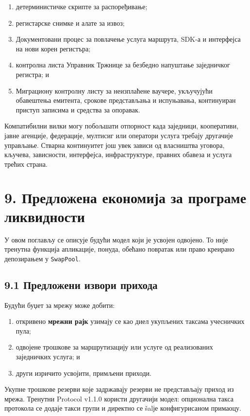 \documentclass[11pt]{article}
\begin{document}
\begin{enumerate}[leftmargin=*]
\item детерминистичке скрипте за распоређивање;
\item регистарске снимке и алате за извоз;
\item Документовани процес за повлачење услуга маршрута, SDK-а и интерфејса на нови корен регистъра;
\item контролна листа Управник Тржнице за безбедно напуштање заједничког регистра; и
\item Миграциону контролну листу за неизплаћене ваучере, укључујући обавештења емитента, срокове представљања и испуњавања, континуиран приступ записима и средства за опоравак.
\end{enumerate}
Компатибилни вилки могу побољшати отпорност када заједници, кооперативи, јавне агенције, федерације, мултисиг или оператори услуга требају другачије управљање. Стварна континуитет још увек зависи од власништва уговора, кључева, зависности, интерфејса, инфраструктуре, правних обавеза и услуга трећих страна.


\section*{9. Предложена економија за програме ликвидности}

У овом поглављу се описује будући модел који је усвојен одвојено. То није тренутна функција апликације, понуда, обећано повратак или право креирано депозирањем у \texttt{SwapPool}.

\subsection*{9.1 Предложени извори прихода}

Будући буџет за мрежу може добити:

\begin{enumerate}[leftmargin=*]
\item откривено \textbf{мрежни рајк} узимају се као диел укупљених таксама учесничких пула;
\item одвојене трошкове за маршрутизацију или услуге од реализованих заједничких услуга; и
\item други изричито усвојити, примљени приходи.
\end{enumerate}
Укупне трошкове резерви које задржавају резерви не представљају приход из мрежа. Тренутни Protocol v1.1.0 користи другачији модел: опционална такса протокола се додаје такси групи и директно се šalје конфигурисаном примаоцу.
\end{document}
